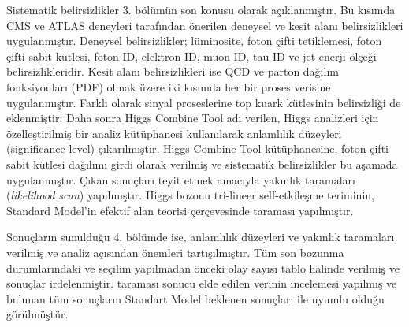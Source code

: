 Sistematik belirsizlikler 3. bölümün son konusu olarak açıklanmıştır. Bu kısımda CMS ve ATLAS deneyleri tarafından önerilen deneysel ve kesit alanı belirsizlikleri uygulanmıştır. Deneysel belirsizlikler; lüminosite, foton çifti tetiklemesi, foton çifti sabit kütlesi, foton ID, elektron ID, muon ID, tau ID ve jet enerji ölçeği belirsizlikleridir. Kesit alanı belirsizlikleri ise QCD ve parton dağılım fonksiyonları (PDF) olmak üzere iki kısımda her bir proses verisine uygulanmıştır. Farklı olarak sinyal proseslerine top kuark kütlesinin belirsizliği de eklenmiştir. Daha sonra Higgs Combine Tool adı verilen, Higgs analizleri için özelleştirilmiş bir analiz kütüphanesi kullanılarak anlamlılık düzeyleri (significance level) çıkarılmıştır. Higgs Combine Tool kütüphanesine, foton çifti sabit kütlesi dağılımı girdi olarak verilmiş ve sistematik belirsizlikler bu aşamada uygulanmıştır. Çıkan sonuçları teyit etmek amacıyla yakınlık taramaları (\emph{likelihood scan}) yapılmıştır. Higgs bozonu tri-lineer self-etkileşme teriminin, Standard Model'in \kl efektif alan teorisi çerçevesinde taraması yapılmıştır.

Sonuçların sunulduğu 4. bölümde ise, anlamlılık düzeyleri ve yakınlık taramaları verilmiş ve analiz açısından önemleri tartışılmıştır. Tüm son bozunma durumlarındaki ve seçilim yapılmadan önceki olay sayısı tablo halinde verilmiş ve sonuçlar irdelenmiştir. \kl taraması sonucu elde edilen verinin incelemesi yapılmış ve bulunan tüm sonuçların Standart Model beklenen sonuçları ile uyumlu olduğu görülmüştür.